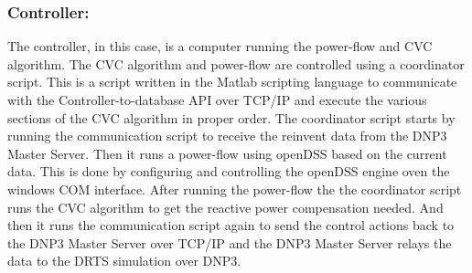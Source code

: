 \subsubsection{Controller:}
The controller, in this case, is a computer running the power-flow and CVC algorithm. The CVC algorithm and power-flow are controlled using a coordinator script. This is a script written in the Matlab scripting language to communicate with the Controller-to-database API over TCP/IP and execute the various sections of the CVC algorithm in proper order. The coordinator script starts by running the communication script to receive the reinvent data from the DNP3 Master Server. Then it runs a power-flow using openDSS based on the current data. This is done by configuring and controlling the openDSS engine oven the windows COM interface. After running the power-flow the the coordinator script runs the CVC algorithm to get the reactive power compensation needed. And then it runs the communication script again to send the control actions back to the DNP3 Master Server over TCP/IP and the DNP3 Master Server relays the data to the DRTS simulation over DNP3.

